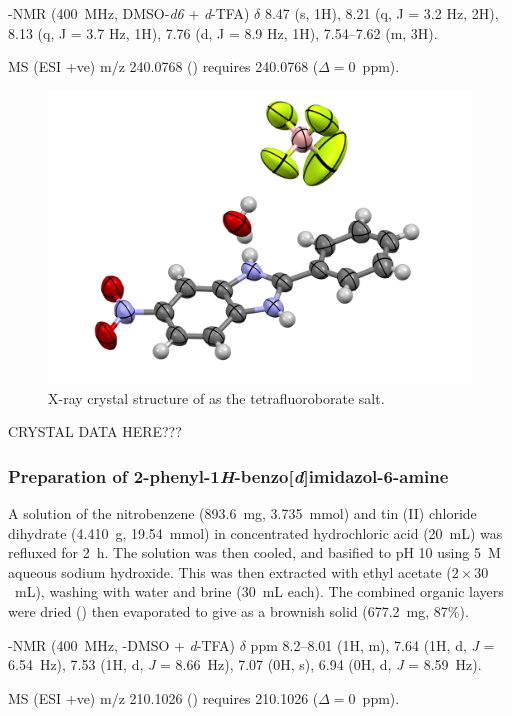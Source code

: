 \begin{refsection}
-NMR (400~MHz, DMSO-\emph{d6} + \textit{d}-TFA) $\delta$ 8.47 (s, 1H), 8.21 (q, J = 3.2 Hz, 2H), 8.13 (q, J = 3.7 Hz, 1H), 7.76 (d, J = 8.9 Hz, 1H), 7.54--7.62 (m, 3H).

MS (ESI +ve) m/z 240.0768 ()  requires 240.0768 ($\Delta=0$~ppm).

\begin{figure}[ht]
    \centering
    \includegraphics[width=0.8\linewidth]{Figures/rhs-nitro-xray.pdf}
    \caption{X-ray crystal structure of  as the tetrafluoroborate salt.}\label{fig:rhs-nitro-xray}
\end{figure}

CRYSTAL DATA HERE???

\subsubsection[Preparation of \refcmpd{rhs-amine}]{Preparation of 2-phenyl-1\emph{H}-benzo[\emph{d}]imidazol-6-amine }
A solution of the nitrobenzene  (893.6~mg, 3.735~mmol) and tin (II) chloride dihydrate (4.410~g, 19.54~mmol) in concentrated hydrochloric acid (20~mL) was refluxed for 2~h.
The solution was then cooled, and basified to pH 10 using 5~M aqueous sodium hydroxide.
This was then extracted with ethyl acetate ($2\times30$~mL), washing with water and brine (30~mL each).
The combined organic layers were dried () then evaporated to give  as a brownish solid (677.2~mg, 87\%).

-NMR (400~MHz, -DMSO + \textit{d}-TFA) $\delta$ ppm 8.2--8.01 (1H, m), 7.64 (1H, d, \emph{J} = 6.54~Hz), 7.53 (1H, d, \emph{J} = 8.66~Hz), 7.07 (0H, s), 6.94 (0H, d, \emph{J} = 8.59~Hz).

MS (ESI +ve) m/z 210.1026 ()  requires 210.1026 ($\Delta=0$~ppm).


\end{refsection}
